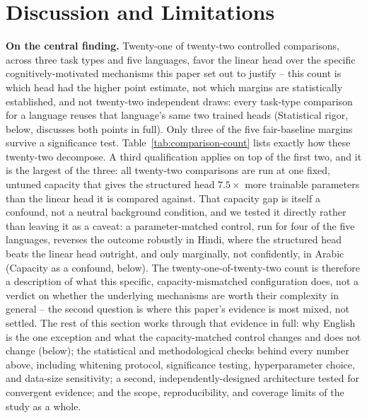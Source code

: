 \documentclass[manuscript]{acmart}
\begin{document}
\section{Discussion and Limitations}
\label{sec:results:limitations}

\textbf{On the central finding.} Twenty-one of twenty-two controlled comparisons, across three task types and five languages, favor the linear head over the specific cognitively-motivated mechanisms this paper set out to justify -- this count is which head had the higher point estimate, not which margins are statistically established, and not twenty-two independent draws: every task-type comparison for a language reuses that language's same two trained heads (Statistical rigor, below, discusses both points in full). Only three of the five fair-baseline margins survive a significance test. Table~\ref{tab:comparison-count} lists exactly how these twenty-two decompose. A third qualification applies on top of the first two, and it is the largest of the three: all twenty-two comparisons are run at one fixed, untuned capacity that gives the structured head $7.5\times$ more trainable parameters than the linear head it is compared against. That capacity gap is itself a confound, not a neutral background condition, and we tested it directly rather than leaving it as a caveat: a parameter-matched control, run for four of the five languages, reverses the outcome robustly in Hindi, where the structured head beats the linear head outright, and only marginally, not confidently, in Arabic (Capacity as a confound, below). The twenty-one-of-twenty-two count is therefore a description of what this specific, capacity-mismatched configuration does, not a verdict on whether the underlying mechanisms are worth their complexity in general -- the second question is where this paper's evidence is most mixed, not settled. The rest of this section works through that evidence in full: why English is the one exception and what the capacity-matched control changes and does not change (below); the statistical and methodological checks behind every number above, including whitening protocol, significance testing, hyperparameter choice, and data-size sensitivity; a second, independently-designed architecture tested for convergent evidence; and the scope, reproducibility, and coverage limits of the study as a whole.
\end{document}

